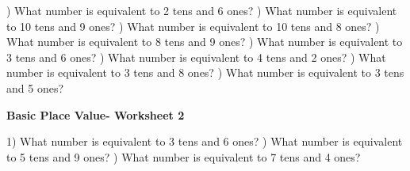 \documentclass{article}%
\begin{document}
\newline%
\newline%
) What number is equivalent to 2 tens and 6 ones?%
\newline%
\newline%
) What number is equivalent to 10 tens and 9 ones?%
\newline%
\newline%
) What number is equivalent to 10 tens and 8 ones?%
\newline%
\newline%
) What number is equivalent to 8 tens and 9 ones?%
\newline%
\newline%
) What number is equivalent to 3 tens and 6 ones?%
\newline%
\newline%
) What number is equivalent to 4 tens and 2 ones?%
\newline%
\newline%
) What number is equivalent to 3 tens and 8 ones?%
\newline%
\newline%
) What number is equivalent to 3 tens and 5 ones?%
\newline%
\newline%
\newline%
\pagebreak%
\large%
\begin{center}%
\textbf{Basic Place Value- Worksheet 2}%
\newline%
\end{center} \normalsize%
1) What number is equivalent to 3 tens and 6 ones?%
\newline%
\newline%
) What number is equivalent to 5 tens and 9 ones?%
\newline%
\newline%
) What number is equivalent to 7 tens and 4 ones?%
\newline%
\newline%
\newline%
\end{document}
